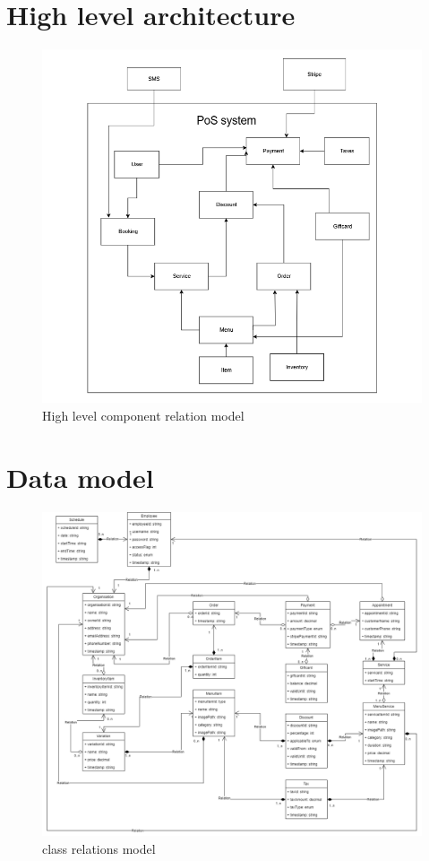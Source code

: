 \documentclass{article}
\begin{document}
    \section{High level architecture}
        \begin{figure}[H]
        \centering
        \includegraphics[width=0.9\linewidth]{PSP/lab-1/diagrams/architecture/package-diagram.png}
        \caption{High level component relation model}
        \label{}
        \end{figure}
    \section{Data model}
    \begin{figure}[H]
        \centering
        \includegraphics[width=1.0\linewidth]{PSP/lab-1/diagrams/data-model/data-model.png}
        \caption{class relations model}
        \label{}
        \end{figure}
\end{document}

